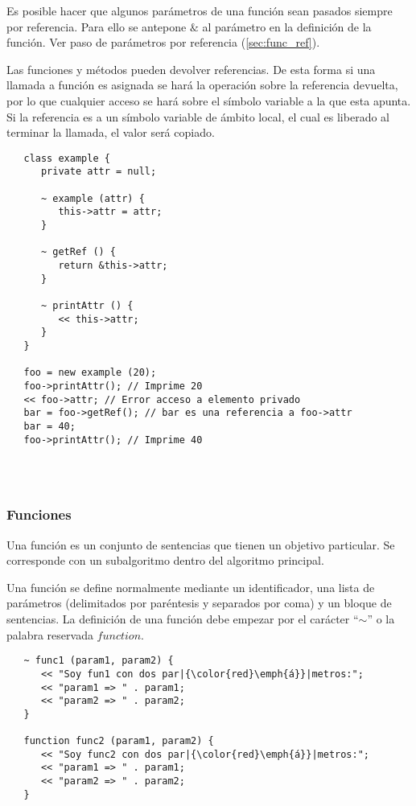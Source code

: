 Es posible hacer que algunos parámetros de una función sean pasados siempre por referencia. Para ello se antepone $\&$ al parámetro en la definición de
la función. Ver paso de parámetros por referencia (\autoref{sec:func_ref}).

Las funciones y métodos pueden devolver referencias. De esta forma si una llamada a función es asignada se hará la operación sobre la referencia devuelta, 
por lo que cualquier acceso se hará sobre el símbolo variable a la que esta apunta. Si la referencia es a un símbolo variable de ámbito local, el cual es liberado al terminar la llamada, 
el valor será copiado. \\

\begin{lstlisting}
   class example {
      private attr = null;
      
      ~ example (attr) {
         this->attr = attr;
      }
      
      ~ getRef () {
         return &this->attr;
      }
      
      ~ printAttr () {
         << this->attr;
      }
   }
   
   foo = new example (20);
   foo->printAttr(); // Imprime 20
   << foo->attr; // Error acceso a elemento privado
   bar = foo->getRef(); // bar es una referencia a foo->attr
   bar = 40; 
   foo->printAttr(); // Imprime 40
   
\end{lstlisting}
\hfill\\

\subsubsection{Funciones} \label{sec:function}
Una función es un conjunto de sentencias que tienen un objetivo particular. Se corresponde con un
subalgoritmo dentro del algoritmo principal.

Una función se define normalmente mediante un identificador, una lista de parámetros (delimitados por paréntesis y separados por coma) y un bloque de sentencias. La
definición de una función debe empezar por el carácter ``$\sim$'' o la palabra reservada $function$. \\

\begin{lstlisting}
   ~ func1 (param1, param2) { 
      << "Soy fun1 con dos par|{\color{red}\emph{á}}|metros:";
      << "param1 => " . param1;
      << "param2 => " . param2;
   }
   
   function func2 (param1, param2) { 
      << "Soy func2 con dos par|{\color{red}\emph{á}}|metros:";
      << "param1 => " . param1;
      << "param2 => " . param2;
   }
\end{lstlisting}
\hfill\\


